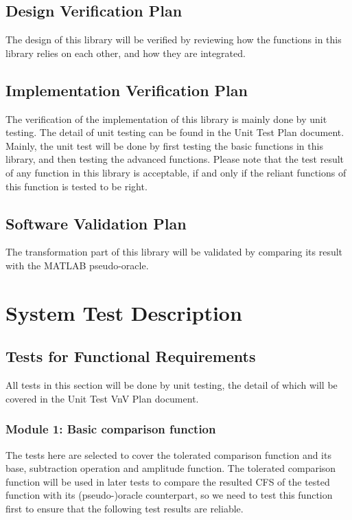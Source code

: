 \documentclass[12pt, titlepage]{article}
\begin{document}
\subsection{Design Verification Plan}

The design of this library will be verified by reviewing how the functions in this library relies on each other, and how they are integrated.

\subsection{Implementation Verification Plan}

The verification of the implementation of this library is mainly done by unit testing. The detail of unit testing can be found in the Unit Test Plan document. Mainly, the unit test will be done by first testing the basic functions in this library, and then testing the advanced functions. Please note that the test result of any function in this library is acceptable, if and only if the reliant functions of this function is tested to be right.
  


\subsection{Software Validation Plan}

The transformation part of this library will be validated by comparing its result with the MATLAB pseudo-oracle.

\section{System Test Description}
	
\subsection{Tests for Functional Requirements}
All tests in this section will be done by unit testing, the detail of which will be covered in the Unit Test VnV Plan document.

\subsubsection{Module 1: Basic comparison function}

The tests here are selected to cover the tolerated comparison function and its base, subtraction operation and amplitude function. The tolerated comparison function will be used in later tests to compare the resulted CFS of the tested function with its (pseudo-)oracle counterpart, so we need to test this function first to ensure that the following test results are reliable.
\end{document}
